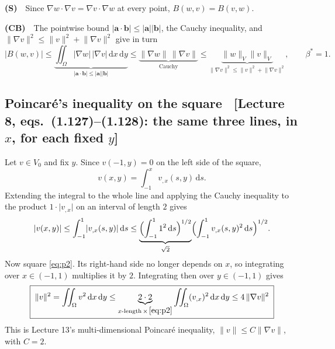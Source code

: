 \documentclass[11pt]{article}
\newcommand{\dxdy}{\,\mathrm{d}x\,\mathrm{d}y}
\newcommand{\norm}[1]{\lVert #1\rVert}
\newcommand{\abs}[1]{\lvert #1\rvert}
\newcommand{\Om}{\Omega}
\newcommand{\grad}{\nabla}
\newcommand{\Iint}{\iint_{\Om}}
\newcommand{\Vsp}{V}
\newcommand{\src}[1]{{\small\color{black!55}\textsf{[#1]}}}
\begin{document}
\textbf{(S)}\ \ Since $\grad w\cdot\grad v=\grad v\cdot\grad w$ at every
point, $B(w,v)=B(v,w)$.

\textbf{(CB)}\ \ The pointwise bound $\abs{\bm a\cdot\bm b}\le\abs{\bm a}\abs{\bm b}$,
the Cauchy inequality, and $\norm{\grad v}^{2}\le\norm{v}^{2}+\norm{\grad v}^{2}$
give in turn
\begin{equation}\label{eq:cb}
  \abs{B(w,v)}
  \le\underbrace{\Iint\abs{\grad w}\,\abs{\grad v}\dxdy}_{\abs{\bm a\cdot\bm b}\le\abs{\bm a}\abs{\bm b}}
  \le\underbrace{\norm{\grad w}\,\norm{\grad v}}_{\text{Cauchy}}
  \le\underbrace{\norm{w}_{\Vsp}\norm{v}_{\Vsp}}_{\norm{\grad v}^{2}\le\norm{v}^{2}+\norm{\grad v}^{2}},
  \qquad\beta^{*}=1 .
\end{equation}

\subsection*{Poincar\'e's inequality on the square
  \ \src{Lecture 8, eqs.~(1.127)--(1.128): the same three lines, in $x$, for
         each fixed $y$}}

Let $v\in V_{0}$ and fix $y$.  Since $v(-1,y)=0$ on the left side of the
square,
\begin{equation}\label{eq:p1}
  v(x,y)=\int_{-1}^{x}v_{,x}(s,y)\,\mathrm{d}s .
\end{equation}
Extending the integral to the whole line and applying the Cauchy inequality to
the product $1\cdot\abs{v_{,x}}$ on an interval of length $2$ gives
\begin{equation}\label{eq:p2}
  \abs{v(x,y)}\le\int_{-1}^{1}\abs{v_{,x}(s,y)}\,\mathrm{d}s
  \le\underbrace{\Bigl(\int_{-1}^{1}1^{2}\,\mathrm{d}s\Bigr)^{1/2}}_{\sqrt2}
     \Bigl(\int_{-1}^{1}v_{,x}(s,y)^{2}\,\mathrm{d}s\Bigr)^{1/2} .
\end{equation}
Now square \eqref{eq:p2}.  Its right-hand side no longer depends on $x$, so
integrating over $x\in(-1,1)$ multiplies it by $2$.  Integrating then over
$y\in(-1,1)$ gives
\begin{equation}\label{eq:poinc}
  \boxed{\;\norm{v}^{2}=\Iint v^{2}\dxdy\le
  \underbrace{2\cdot2}_{x\text{-length}\,\times\,\eqref{eq:p2}}\Iint(v_{,x})^{2}\dxdy
  \le4\,\norm{\grad v}^{2}\;}
\end{equation}
This is Lecture 13's multi-dimensional Poincar\'e inequality,
$\norm{v}\le C\norm{\grad v}$, with $C=2$.

\end{document}
